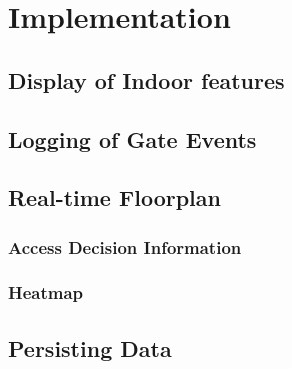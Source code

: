 \chapter{Implementation}

\section{Display of Indoor features}
\label{Display of Indoor features}

\section{Logging of Gate Events}
\label{Logging of Gate Events}

\section{Real-time Floorplan}
\label{Real-time Floorplan}

\subsection{Access Decision Information}

\subsection{Heatmap}

\section{Persisting Data}
\label{Persisting Data}

